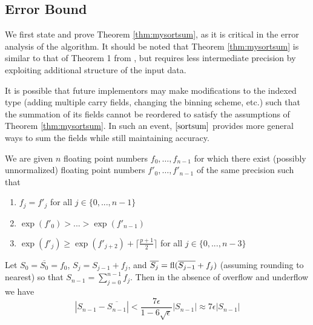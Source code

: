\subsection{Error Bound}
    \label{sec:primitiveops_error}

    We first state and prove Theorem \ref{thm:mysortsum}, as it is critical in
    the error analysis of the algorithm. It should be noted that Theorem
    \ref{thm:mysortsum} is similar to that of Theorem 1 from \cite{sortsum},
    but requires less intermediate precision by exploiting additional structure
    of the input data.

    It is possible that future implementors may make modifications to the
    indexed type (adding multiple carry fields, changing the binning scheme,
    etc.) such that the summation of its fields cannot be reordered to satisfy
    the assumptions of Theorem \ref{thm:mysortsum}. In such an event,
    $\cite{sortsum}$ provides more general ways to sum the fields while still
    maintaining accuracy.
      \begin{samepage}
    \begin{thm}
      We are given $n$ floating point numbers $f_0, \ldots, f_{n - 1}$ for which there
      exist (possibly unnormalized) floating point numbers $f'_0, \ldots, f'_{n -1}$
      of the same precision such that
      \begin{enumerate}
        \item $f_j = f'_j$ for all $j \in \{0, ..., n - 1\}$
        \item $\exp(f'_0) > ... > \exp(f'_{n - 1})$
        \item $\exp(f'_j) \geq \exp(f'_{j + 2}) + \lceil\frac{p + 1}{2}\rceil$ for all $j \in \{0, ..., n - 3\}$
      \end{enumerate}
      \label{thm:mysortsum}
      Let $S_0 = \overline{S_0} = f_0$, $S_j = S_{j - 1} + f_j$,
      and $\overline{S_j} = \text{fl}(\overline{S_{j - 1}} + f_j)$ (assuming rounding to nearest)
      so that $S_{n - 1} = \sum \limits_{j = 0}^{n - 1} f_j$.
      Then in the absence of overflow and underflow we have
      \begin{equation*}
        \left|S_{n - 1} - \overline{S_{n - 1}}\right| < \frac{7\epsilon}{1 - 6\sqrt\epsilon}|S_{n - 1}| \approx 7 \epsilon |S_{n - 1}|
      \end{equation*}
    \end{thm}
    \end{samepage}

